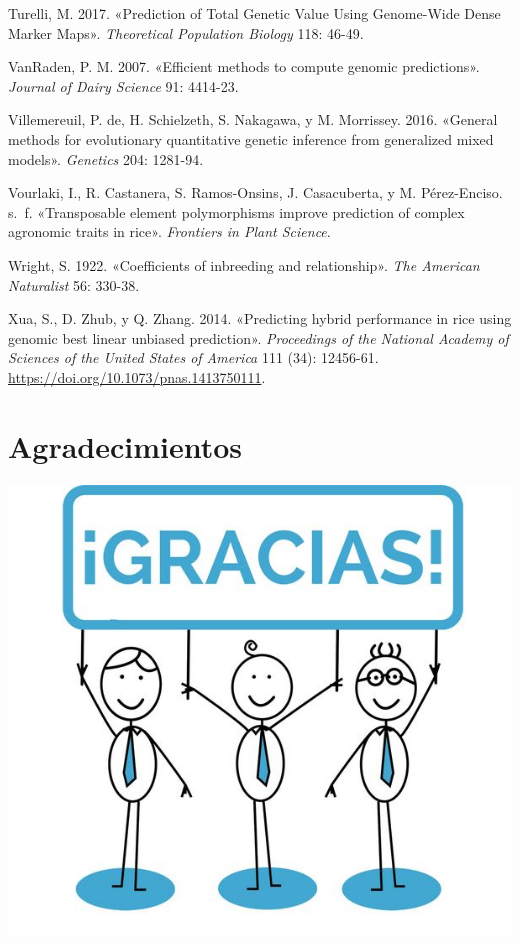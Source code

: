 \documentclass[11pt,spanish,a4paper,oneside,]{book} %
\begin{document}
\leavevmode\hypertarget{ref-cite:9}{}%
Turelli, M. 2017. «Prediction of Total Genetic Value Using Genome-Wide Dense Marker Maps». \emph{Theoretical Population Biology} 118: 46-49.

\leavevmode\hypertarget{ref-cite:39}{}%
VanRaden, P. M. 2007. «Efficient methods to compute genomic predictions». \emph{Journal of Dairy Science} 91: 4414-23.

\leavevmode\hypertarget{ref-cite:4}{}%
Villemereuil, P. de, H. Schielzeth, S. Nakagawa, y M. Morrissey. 2016. «General methods for evolutionary quantitative genetic inference from generalized mixed models». \emph{Genetics} 204: 1281-94.

\leavevmode\hypertarget{ref-cite:26}{}%
Vourlaki, I., R. Castanera, S. Ramos-Onsins, J. Casacuberta, y M. Pérez-Enciso. s.~f. «Transposable element polymorphisms improve prediction of complex agronomic traits in rice». \emph{Frontiers in Plant Science}.

\leavevmode\hypertarget{ref-cite:12}{}%
Wright, S. 1922. «Coefficients of inbreeding and relationship». \emph{The American Naturalist} 56: 330-38.

\leavevmode\hypertarget{ref-cite:25}{}%
Xua, S., D. Zhub, y Q. Zhang. 2014. «Predicting hybrid performance in rice using genomic best linear unbiased prediction». \emph{Proceedings of the National Academy of Sciences of the United States of America} 111 (34): 12456-61. \url{https://doi.org/10.1073/pnas.1413750111}.

\endgroup

\hypertarget{agradecimientos}{%
\chapter*{Agradecimientos}\label{agradecimientos}}


\includegraphics{figures/uvalogo_regular_p_en.pdf}

\backmatter
\end{document}
